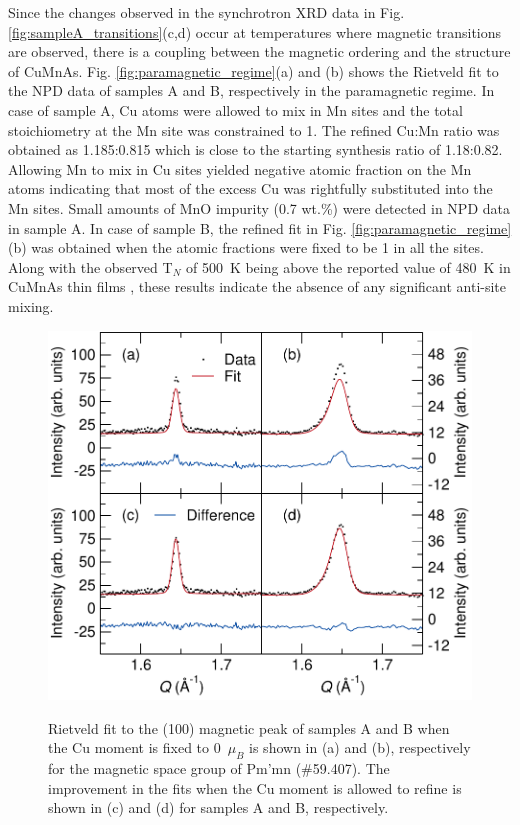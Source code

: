 \documentclass[letterpaper,10pt,doublespacing,edeposit]{uiucthesis2020}
\begin{document}
\begin{mainmatter}
Since the changes observed in the synchrotron XRD data in Fig. \ref{fig:sampleA_transitions}(c,d) occur at temperatures where magnetic transitions are observed, there is a coupling between the magnetic ordering and the structure of CuMnAs. Fig. \ref{fig:paramagnetic_regime}(a) and (b) shows the Rietveld fit to the NPD data of samples A and B, respectively in the paramagnetic regime. In case of sample A, Cu atoms were allowed to mix in Mn sites and the total stoichiometry at the Mn site was constrained to 1. The refined Cu:Mn ratio was obtained as 1.185:0.815 which is close to the starting synthesis ratio of 1.18:0.82. Allowing Mn to mix in Cu sites yielded negative atomic fraction on the Mn atoms indicating that most of the excess Cu was rightfully substituted into the Mn sites. Small amounts of MnO impurity (0.7 wt.\%) were detected in NPD data in sample A. In case of sample B, the refined fit in Fig. \ref{fig:paramagnetic_regime}(b) was obtained when the atomic fractions were fixed to be 1 in all the sites. Along with the observed T$_N$ of 500~K being above the reported value of 480~K in CuMnAs thin films \cite{Wadley2015}, these results indicate the absence of any significant anti-site mixing.


\begin{figure}
\centering\includegraphics[width=0.8\columnwidth]{figures/ch7/400K_ECHINDA_POWGEN_mag_peaks_cropped.pdf} \\
\caption{\label{fig:400K_NPD_data}
Rietveld fit to the (100) magnetic peak of samples A and B when the Cu moment is fixed to 0~$\mu_B$ is shown in (a) and (b), respectively for the magnetic space group of Pm'mn (\#59.407). The improvement in the fits when the Cu moment is allowed to refine is shown in (c) and (d) for samples A and B, respectively.
} 
\end{figure}


\end{mainmatter}
\end{document}
